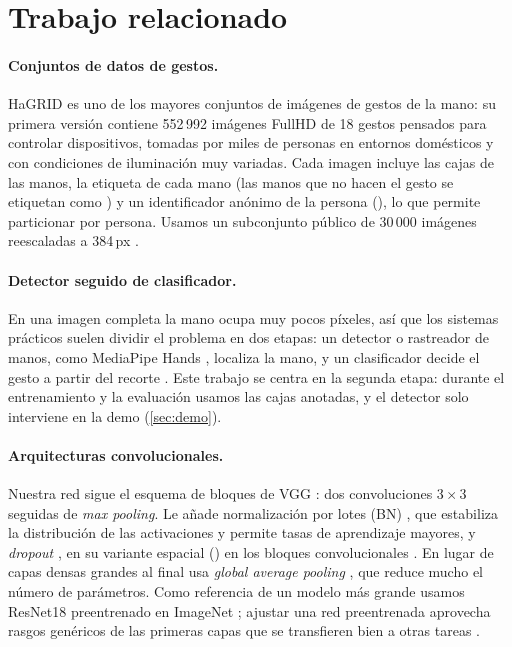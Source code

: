 \section{Trabajo relacionado}
\label{sec:relacionado}

\paragraph{Conjuntos de datos de gestos.}
HaGRID \citep{kapitanov2024hagrid} es uno de los mayores conjuntos de imágenes de gestos de la
mano: su primera versión contiene 552\,992 imágenes FullHD de 18 gestos pensados para controlar
dispositivos, tomadas por miles de personas en entornos domésticos y con condiciones de
iluminación muy variadas. Cada imagen incluye las cajas de las manos, la etiqueta de cada mano
(las manos que no hacen el gesto se etiquetan como ) y un identificador
anónimo de la persona (), lo que permite particionar por persona. Usamos un
subconjunto público de 30\,000 imágenes reescaladas a 384\,px \citep{mills_hagridsample}.

\paragraph{Detector seguido de clasificador.}
En una imagen completa la mano ocupa muy pocos píxeles, así que los sistemas prácticos suelen
dividir el problema en dos etapas: un detector o rastreador de manos, como MediaPipe Hands
\citep{zhang2020mediapipe}, localiza la mano, y un clasificador decide el gesto a partir del
recorte \citep{pisharady2015review}. Este trabajo se centra en la segunda etapa: durante el
entrenamiento y la evaluación usamos las cajas anotadas, y el detector solo interviene en la
demo (\cref{sec:demo}).

\paragraph{Arquitecturas convolucionales.}
Nuestra red sigue el esquema de bloques de VGG \citep{simonyan2015vgg}: dos convoluciones
$3\times3$ seguidas de \emph{max pooling}. Le añade normalización por lotes (BN)
\citep{ioffe2015bn}, que estabiliza la distribución de las activaciones y permite tasas de
aprendizaje mayores, y \emph{dropout} \citep{srivastava2014dropout}, en su variante espacial
() en los bloques convolucionales \citep{tompson2015spatialdropout}. En lugar de
capas densas grandes al final usa \emph{global average pooling} \citep{lin2014nin}, que reduce
mucho el número de parámetros. Como referencia de un modelo más grande usamos ResNet18
\citep{he2016resnet} preentrenado en ImageNet \citep{deng2009imagenet}; ajustar una red
preentrenada aprovecha rasgos genéricos de las primeras capas que se transfieren bien a otras
tareas \citep{yosinski2014transferable}.

